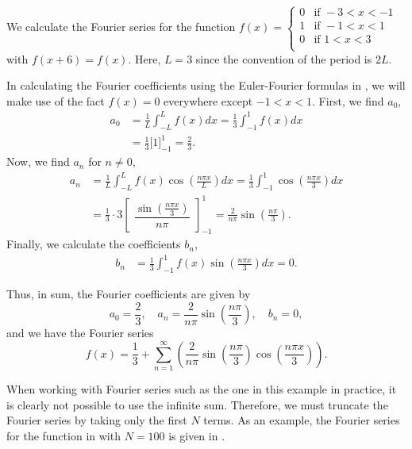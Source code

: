 \begin{eg}\label{eg:fourier1}
	We calculate the Fourier series for the function 
	\( f(x) = \begin{cases} 
		0 & \text{if } -3<x<-1 \\
		1 & \text{if } -1<x<1 \\
		0 & \text{if } 1<x<3 \\
	\end{cases}\)
	with $f(x+6) = f(x)$. Here, $L=3$ since the convention of the period is $2L$. 
	
	In calculating the Fourier coefficients using the Euler-Fourier formulas in , we will make use of the fact $f(x)=0$ everywhere except $-1<x<1$. First, we find $a_0$,
	\begin{align*}
		a_0 &= \frac{1}{L} \int_{-L}^{L} f(x)dx = \frac{1}{3} \int_{-1}^{1} f(x)dx \\
		&= \frac{1}{3} \big[1\big]^1_{-1} = \frac{2}{3}.
	\end{align*}
	Now, we find $a_n$ for $n\neq 0$,
	\begin{align*}
		a_n &= \frac{1}{L} \int_{-L}^L f(x) \cos{\left( \frac{n \pi x}{L} \right)} dx = \frac{1}{3} \int_{-1}^1 \cos{\left( \frac{n \pi x}{3} \right)} dx \\
		&= \frac{1}{3} \cdot 3 \begin{bmatrix} \dfrac{\sin{\left( \frac{n \pi x}{3} \right)}}{n \pi} \end{bmatrix}^1_{-1} = \frac{2}{n \pi} \sin{\left( \frac{n \pi}{3} \right)}.
	\end{align*}
	Finally, we calculate the coefficients $b_n$,
	\begin{align*}
		b_n &= \frac{1}{3} \int_{-1}^1 f(x) \sin{\left( \frac{n \pi x}{3} \right)} dx = 0.
	\end{align*}
	
	Thus, in sum, the Fourier coefficients are given by
	\[
	a_0 = \frac23, \quad a_n = \frac{2}{n \pi} \sin{\left( \frac{n \pi}{3} \right)}, \quad b_n = 0,
	\]
	and we have the Fourier series
	\[
	f(x) = \frac{1}{3} + \sum_{n=1}^{\infty} \left( \frac{2}{n \pi} \sin{\left( \frac{n \pi}{3} \right)} \cos{\left( \frac{n \pi x}{3} \right)} \right).
	\]
\end{eg}

When working with Fourier series such as the one in this example in practice, it is clearly not possible to use the infinite sum. Therefore, we must truncate the Fourier series by taking only the first $N$ terms. As an example, the Fourier series for the function in  with $N=100$ is given in .


